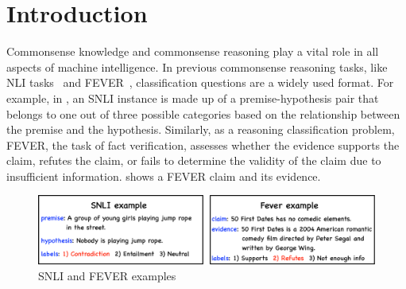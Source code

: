 \section{Introduction}
\label{intro}


Commonsense knowledge and commonsense reasoning play a vital role in all aspects of machine intelligence. 
In previous commonsense reasoning tasks, like 
NLI tasks~\cite{bowman2015large,williams2018broad} and FEVER~\cite{thorne2018fever}, 
classification questions are a widely used format.
For example, in , 
an SNLI instance is made up of a premise-hypothesis pair that belongs to one
out of three possible categories based on the relationship 
between the premise and the hypothesis. 
Similarly, as a reasoning classification problem,
FEVER, the task of fact verification, 
assesses whether the evidence supports the claim, refutes the claim, 
or fails to determine the validity of the claim due to insufficient information. 
 shows 
a FEVER claim and its evidence.

\begin{figure}[th!]
	\centering
	\includegraphics[width=0.9\columnwidth]{figures/noise_example.eps}
	\caption{SNLI and FEVER examples}
	\label{fig:example}
\end{figure}


